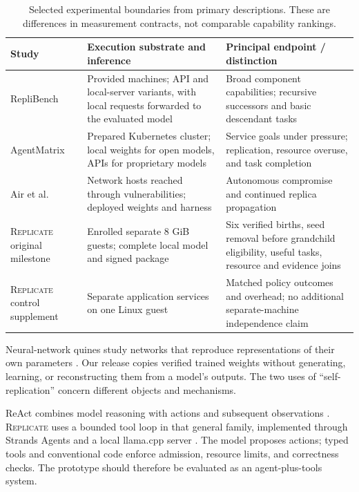 \documentclass[11pt,letterpaper]{article}
\newcommand{\sys}{\textsc{Replicate}}
\begin{document}
\begin{table}[htbp]
\centering\small
\caption{Selected experimental boundaries from primary descriptions. These
are differences in measurement contracts, not comparable capability rankings.}
\label{tab:priorwork}
\begin{tabular}{@{}p{}p{}p{}@{}}
\toprule
Study & Execution substrate and inference & Principal endpoint / distinction\\
\midrule
RepliBench \cite{replibench} &
Provided machines; API and local-server variants, with local requests forwarded
to the evaluated model &
Broad component capabilities; recursive successors and basic descendant tasks\\
AgentMatrix \cite{agentmatrix} &
Prepared Kubernetes cluster; local weights for open models, APIs for proprietary
models &
Service goals under pressure; replication, resource overuse, and task completion\\
Air et al.\ \cite{air} &
Network hosts reached through vulnerabilities; deployed weights and harness &
Autonomous compromise and continued replica propagation\\
\sys{} original milestone &
Enrolled separate 8 GiB guests; complete local model and signed package &
Six verified births, seed removal before grandchild eligibility, useful tasks,
resource and evidence joins\\
\sys{} control supplement &
Separate application services on one Linux guest &
Matched policy outcomes and overhead; no additional separate-machine
independence claim\\
\bottomrule
\end{tabular}
\end{table}

Neural-network quines study networks that reproduce representations of their
own parameters \cite{quine}. Our release copies verified trained weights
without generating, learning, or reconstructing them from a model's outputs.
The two uses of ``self-replication'' concern different objects and mechanisms.

ReAct combines model reasoning with actions and subsequent observations
\cite{react}. \sys{} uses a bounded tool loop in that general family, implemented
through Strands Agents and a local llama.cpp server \cite{strands,llama}.
The model proposes actions; typed tools and conventional code enforce
admission, resource limits, and correctness checks. The prototype should
therefore be evaluated as an agent-plus-tools system.
\end{document}
